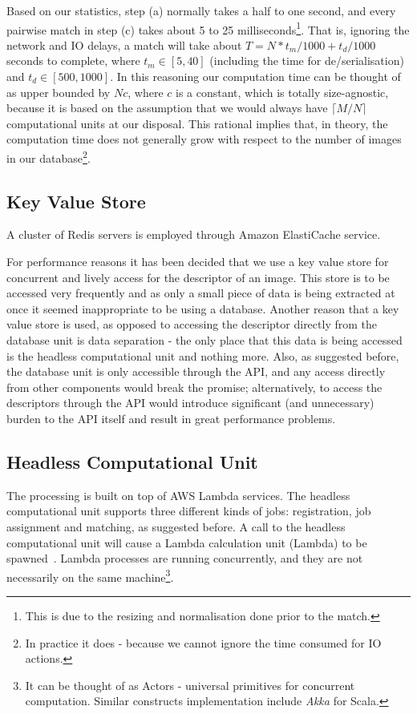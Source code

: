 Based on our statistics, step (a) normally takes a half to one second, and every pairwise match in step (c) takes about 5 to 25 milliseconds\footnote{This is due to the resizing and normalisation done prior to the match.}. That is, ignoring the network and IO delays, a match will take about $T = N * t_m / 1000 + t_d / 1000$ seconds to complete, where $t_m \in [5, 40]$ (including the time for de/serialisation) and $t_d \in [500, 1000]$. In this reasoning our computation time can be thought of as upper bounded by $Nc$, where $c$ is a constant, which is totally size-agnostic, because it is based on the assumption that we would always have $\lceil M / N \rceil$ computational units at our disposal. This rational implies that, in theory, the computation time does not generally grow with respect to the number of images in our database\footnote{In practice it does - because we cannot ignore the time consumed for IO actions.}.

\subsection{Key Value Store}
A cluster of Redis servers is employed through Amazon ElastiCache service.

For performance reasons it has been decided that we use a key value store for concurrent and lively access for the descriptor of an image. This store is to be accessed very frequently and as only a small piece of data is being extracted at once it seemed inappropriate to be using a database. Another reason that a key value store is used, as opposed to accessing the descriptor directly from the database unit is data separation - the only place that this data is being accessed is the headless computational unit and nothing more. Also, as suggested before, the database unit is only accessible through the API, and any access directly from other components would break the promise; alternatively, to access the descriptors through the API would introduce significant (and unnecessary) burden to the API itself and result in great performance problems.

\subsection{Headless Computational Unit}
\label{sec:lambda}
The processing is built on top of AWS Lambda services. The headless computational unit supports three different kinds of jobs: registration, job assignment and matching, as suggested before. A call to the headless computational unit will cause a Lambda calculation unit (Lambda) to be spawned~\cite{lambda}. Lambda processes are running concurrently, and they are not necessarily on the same machine\footnote{It can be thought of as Actors - universal primitives for concurrent computation. Similar constructs implementation include \textit{Akka} for Scala.}.

